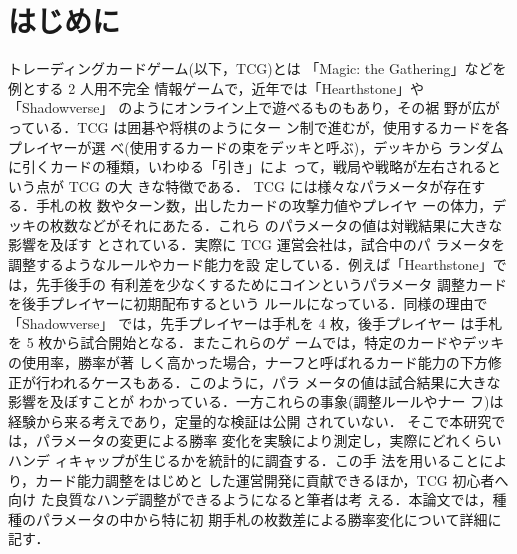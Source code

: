 \documentclass[twocolumn]{ltjsarticle}
\begin{document}
\section{はじめに}
トレーディングカードゲーム(以下，TCG)とは
「Magic: the Gathering」などを例とする 2 人用不完全
情報ゲームで，近年では「Hearthstone」や「Shadowverse」
のようにオンライン上で遊べるものもあり，その裾
野が広がっている．TCG は囲碁や将棋のようにター
ン制で進むが，使用するカードを各プレイヤーが選
べ(使用するカードの束をデッキと呼ぶ)，デッキから
ランダムに引くカードの種類，いわゆる「引き」によ
って，戦局や戦略が左右されるという点が TCG の大
きな特徴である．
TCG には様々なパラメータが存在する．手札の枚
数やターン数，出したカードの攻撃力値やプレイヤ
ーの体力，デッキの枚数などがそれにあたる．これら
のパラメータの値は対戦結果に大きな影響を及ぼす
とされている．実際に TCG 運営会社は，試合中のパ
ラメータを調整するようなルールやカード能力を設
定している．例えば「Hearthstone」では，先手後手の
有利差を少なくするためにコインというパラメータ
調整カードを後手プレイヤーに初期配布するという
ルールになっている．同様の理由で「Shadowverse」
では，先手プレイヤーは手札を 4 枚，後手プレイヤー
は手札を 5 枚から試合開始となる．またこれらのゲ
ームでは，特定のカードやデッキの使用率，勝率が著
しく高かった場合，ナーフと呼ばれるカード能力の下方修正が行われるケースもある．このように，パラ
メータの値は試合結果に大きな影響を及ぼすことが
わかっている．一方これらの事象(調整ルールやナー
フ)は経験から来る考えであり，定量的な検証は公開
されていない．
そこで本研究では，パラメータの変更による勝率
変化を実験により測定し，実際にどれくらいハンデ
ィキャップが生じるかを統計的に調査する．この手
法を用いることにより，カード能力調整をはじめと
した運営開発に貢献できるほか，TCG 初心者へ向け
た良質なハンデ調整ができるようになると筆者は考
える．本論文では，種種のパラメータの中から特に初
期手札の枚数差による勝率変化について詳細に記す．


\end{document}
